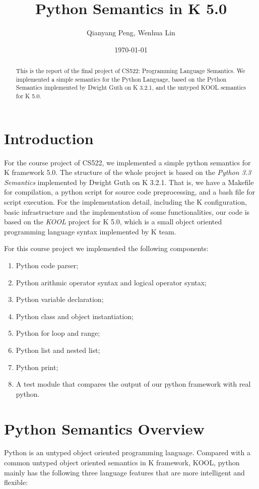 \documentclass[a4paper]{article}
\title{Python Semantics in K 5.0}
\author{Qianyang Peng, Wenhua Lin}
\date{\today}
\begin{document}
\maketitle

\begin{abstract}
This is the report of the final project of CS522: Programming Language Semantics. We implemented a simple semantics for the Python Language, based on the Python Semantics implemented by Dwight Guth on K 3.2.1, and the untyped KOOL semantics for K 5.0.
\end{abstract}

\section{Introduction}
For the course project of CS522, we implemented a simple python semantics for K framework 5.0. The structure of the whole project is based on the \emph{Python 3.3 Semantics} implemented by Dwight Guth on K 3.2.1. That is, we have a Makefile for compilation, a python script for source code preprocessing, and a bash file for script execution. For the implementation detail, including the K configuration, basic infrastructure and the implementation of some functionalities, our code is based on the \emph{KOOL} project for K 5.0, which is a small object oriented programming language syntax implemented by K team.

For this course project we implemented the following components:

\begin{enumerate}
    \item Python code parser;
    \item Python arithmic operator syntax and logical operator syntax;
    \item Python variable declaration;
    \item Python class and object instantiation;
    \item Python for loop and range;
    \item Python list and nested list;
    \item Python print;
    \item A test module that compares the output of our python framework with real python.
\end{enumerate}

\section{Python Semantics Overview}
Python is an untyped object oriented programming language. Compared with a common untyped object oriented semantics in K framework, KOOL, python mainly has the following three language features that are more intelligent and flexible:
\end{document}
